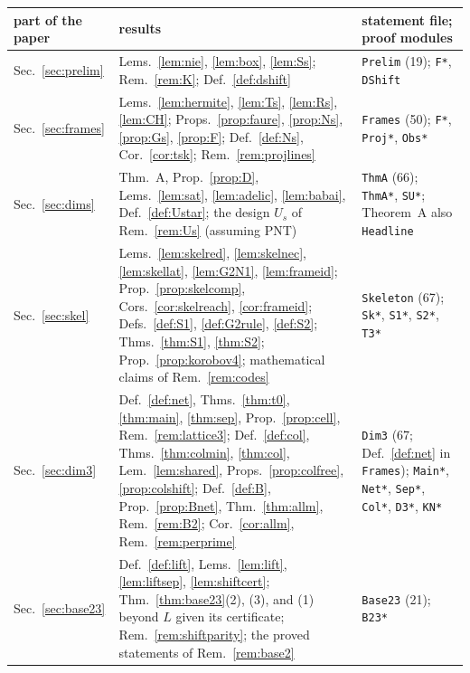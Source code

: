 \documentclass[11pt]{amsart}
\theoremstyle{definition}
\theoremstyle{plain}
\begin{document}
\begin{table}[tbp]\centering\footnotesize
\begin{tabular}{@{}>{\raggedright\arraybackslash}p{2.0cm}>{\raggedright\arraybackslash}p{8.1cm}>{\raggedright\arraybackslash}p{4.5cm}@{}}
\toprule
part of the paper & results & statement file; proof modules\\
\midrule
Sec.~\ref{sec:prelim} & Lems.~\ref{lem:nie}, \ref{lem:box}, \ref{lem:Ss}; Rem.~\ref{rem:K}; Def.~\ref{def:dshift} & \texttt{Prelim} (19); \texttt{F*}, \texttt{DShift}\\
Sec.~\ref{sec:frames} & Lems.~\ref{lem:hermite}, \ref{lem:Ts}, \ref{lem:Rs}, \ref{lem:CH}; Props.~\ref{prop:faure}, \ref{prop:Ns}, \ref{prop:Gs}, \ref{prop:F}; Def.~\ref{def:Ns}, Cor.~\ref{cor:tsk}; Rem.~\ref{rem:projlines} & \texttt{Frames} (50); \texttt{F*}, \texttt{Proj*}, \texttt{Obs*}\\
Sec.~\ref{sec:dims} & Thm.~A, Prop.~\ref{prop:D}, Lems.~\ref{lem:sat}, \ref{lem:adelic}, \ref{lem:babai}, Def.~\ref{def:Ustar}; the design $U_s$ of Rem.~\ref{rem:Us} (assuming PNT) & \texttt{ThmA} (66); \texttt{ThmA*}, \texttt{SU*}; Theorem~A also \texttt{Headline}\\
Sec.~\ref{sec:skel} & Lems.~\ref{lem:skelred}, \ref{lem:skelnec}, \ref{lem:skellat}, \ref{lem:G2N1}, \ref{lem:frameid}; Prop.~\ref{prop:skelcomp}, Cors.~\ref{cor:skelreach}, \ref{cor:frameid}; Defs.~\ref{def:S1}, \ref{def:G2rule}, \ref{def:S2}; Thms.~\ref{thm:S1}, \ref{thm:S2}; Prop.~\ref{prop:korobov4}; mathematical claims of Rem.~\ref{rem:codes} & \texttt{Skeleton} (67); \texttt{Sk*}, \texttt{S1*}, \texttt{S2*}, \texttt{T3*}\\
Sec.~\ref{sec:dim3} & Def.~\ref{def:net}, Thms.~\ref{thm:t0}, \ref{thm:main}, \ref{thm:sep}, Prop.~\ref{prop:cell}, Rem.~\ref{rem:lattice3}; Def.~\ref{def:col}, Thms.~\ref{thm:colmin}, \ref{thm:col}, Lem.~\ref{lem:shared}, Props.~\ref{prop:colfree}, \ref{prop:colshift}; Def.~\ref{def:B}, Prop.~\ref{prop:Bnet}, Thm.~\ref{thm:allm}, Rem.~\ref{rem:B2}; Cor.~\ref{cor:allm}, Rem.~\ref{rem:perprime} & \texttt{Dim3} (67; Def.~\ref{def:net} in \texttt{Frames}); \texttt{Main*}, \texttt{Net*}, \texttt{Sep*}, \texttt{Col*}, \texttt{D3*}, \texttt{KN*}\\
Sec.~\ref{sec:base23} & Def.~\ref{def:lift}, Lems.~\ref{lem:lift}, \ref{lem:liftsep}, \ref{lem:shiftcert}; Thm.~\ref{thm:base23}(2), (3), and (1) beyond $L$ given its certificate; Rem.~\ref{rem:shiftparity}; the proved statements of Rem.~\ref{rem:base2} & \texttt{Base23} (21); \texttt{B23*}\\

\end{tabular}
\end{table}
\end{document}
